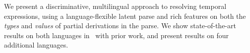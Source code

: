 We present a discriminative, multilingual approach to resolving
  temporal expressions, using a language-flexible latent parse and rich
  features on both the \textit{types} and \textit{values} of partial
  derivations in the parse.
We show state-of-the-art results on both languages in \tempeval\ with prior
  work, and present results on four additional languages.
